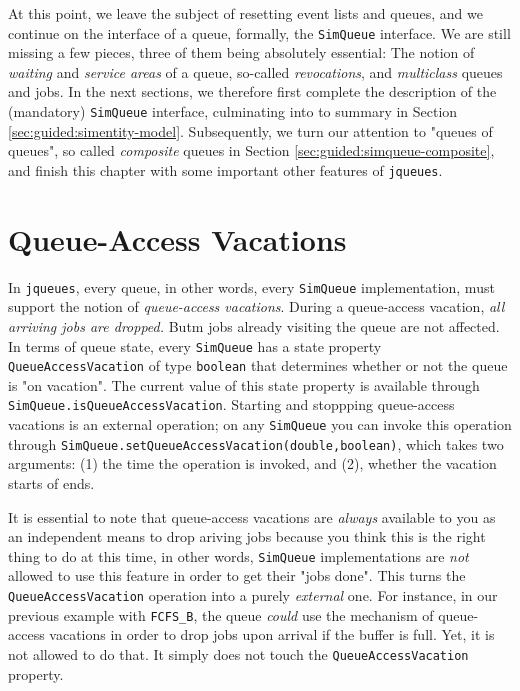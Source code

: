 \documentclass[12pt]{book}
\begin{document}
At this point,
  we leave the subject of resetting event lists and queues,
  and we continue on the interface of a queue,
  formally, the \lstinline|SimQueue| interface.
We are still missing a few pieces,
  three of them being absolutely essential:
  The notion of {\em waiting\/} and {\em service areas\/}
  of a queue, so-called {\em revocations},
  and {\em multiclass\/} queues and jobs.
In the next sections,
  we therefore first complete the description of the (mandatory)
  \lstinline|SimQueue| interface,
  culminating into to summary
  in Section \ref{sec:guided:simentity-model}.
Subsequently,
  we turn our attention to "queues of queues",
  so called {\em composite\/} queues in Section \ref{sec:guided:simqueue-composite},
  and finish this chapter with
  some important other features of \lstinline|jqueues|.

\section{Queue-Access Vacations}
\label{sec:guided:qav}

In \lstinline|jqueues|, every queue,
  in other words, every \lstinline|SimQueue| implementation,
  must support the notion of {\em queue-access vacations}.
During a queue-access vacation,
  {\em all arriving jobs are dropped.}
Butm jobs already visiting the queue are not affected.
In terms of queue state,
  every \lstinline|SimQueue| has a state
  property \lstinline|QueueAccessVacation|
  of type \lstinline|boolean|
  that determines whether or not the
  queue is "on vacation".
The current value of this state property is available through
  \lstinline{SimQueue.isQueueAccessVacation}.
Starting and stoppping queue-access vacations
  is an external operation;
  on any \lstinline{SimQueue} you can
  invoke this operation
  through \lstinline{SimQueue.setQueueAccessVacation(double,boolean)},
  which takes two arguments: (1) the time the operation is invoked,
  and (2), whether the vacation starts of ends.

It is essential to note that queue-access vacations
  are {\em always\/} available to you
  as an independent means to drop ariving jobs
  because you think this is the right thing to do at this time,
  in other words,
  \lstinline|SimQueue| implementations
  are {\em not\/} allowed to use this feature
  in order to get their "jobs done".
This turns the \lstinline|QueueAccessVacation|
  operation into a purely {\em external\/} one.
For instance,
  in our previous example with \lstinline|FCFS_B|,
  the queue {\em could\/} use the mechanism
  of queue-access vacations in order to
  drop jobs upon arrival if the buffer is full.
Yet, it is not allowed to do that.
It simply does not touch the \lstinline|QueueAccessVacation| property.
\end{document}
